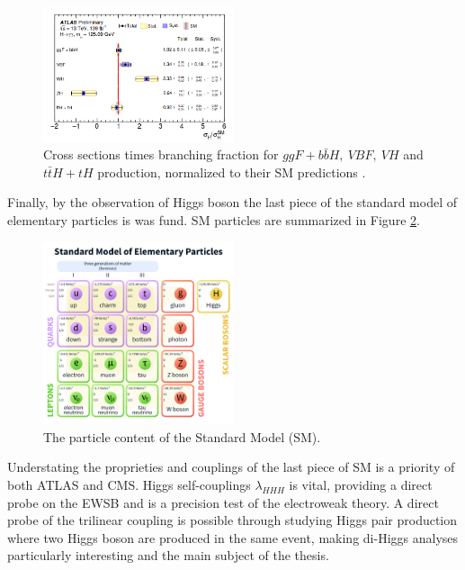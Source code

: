 \begin{figure}[htbp]
    \centering
    \includegraphics[width=0.5\textwidth]{Ch1/Img/HXsecRun2.png}
    \caption{Cross sections times branching fraction for $ggF+b\bar{b}H , \ VBF, \ VH$ and $t\bar{t}H + tH$ production, normalized to their SM predictions \cite{ATLAS_2020}.}
    \label{fig:chap1:H2012:HXsecRun2}
\end{figure}
Finally, by the observation of Higgs boson the last piece of the standard model of elementary particles is was fund. SM particles are summarized in Figure \ref{fig:chap1:H2012:SM}.
\begin{figure}[htbp]
    \centering
    \includegraphics[width=0.5\textwidth]{Ch1/Img/SM_particles.png}
    \caption{The particle content of the Standard Model (SM).}
    \label{fig:chap1:H2012:SM}
\end{figure}
Understating the proprieties and couplings of the last piece of SM is a priority of both ATLAS and CMS. Higgs self-couplings $\lambda_{HHH}$ is vital, providing a direct probe on the EWSB and is a precision test of the electroweak theory. A direct probe of the trilinear coupling is possible through studying Higgs pair production where two Higgs boson are produced in the same event, making di-Higgs analyses particularly interesting and the main subject of the thesis.

